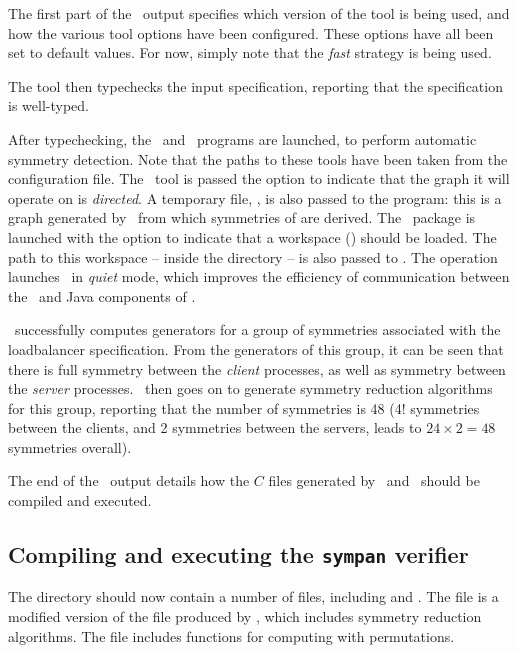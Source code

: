 The first part of the \topspin\ output specifies which version of
the tool is being used, and how the various tool options have been
configured. These options have all been set to default values.  For
now, simply note that the \emph{fast} strategy is being used.

The tool then typechecks the input specification, reporting that the
specification is well-typed.

After typechecking, the \saucy\ and \gap\ programs are launched, to
perform automatic symmetry detection.  Note that the paths to these
tools have been taken from the configuration file.  The \saucy\ tool
is passed the  option to indicate that the graph it will
operate on is \emph{directed}.  A temporary file,
, is also passed to the program: this is a graph
generated by \topspin\ from which symmetries of
 are derived.  The \gap\ package is launched
with the  option to indicate that a workspace
() should be loaded.  The
path to this workspace --  inside the
 directory -- is also passed to \gap.  The
 operation launches \gap\ in \emph{quiet} mode, which
improves the efficiency of communication between the \gap\ and Java
components of \topspin.

\topspin\ successfully computes generators for a group of symmetries
associated with the loadbalancer specification.  From the generators
of this group, it can be seen that there is full symmetry between
the \emph{client} processes, as well as symmetry between the
\emph{server} processes.  \topspin\ then goes on to generate
symmetry reduction algorithms for this group, reporting that the
number of symmetries is 48 (4! symmetries between the clients, and 2
symmetries between the servers, leads to $24\times 2=48$ symmetries
overall).

The end of the \topspin\ output details how the $C$ files generated
by \spin\ and \topspin\ should be compiled and executed.

\subsection{Compiling and executing the {\bf \texttt{sympan}} verifier}

The  directory should now contain a number of
files, including  and .  The
 file is a modified version of the 
file produced by \spin, which includes symmetry reduction
algorithms.  The  file includes functions for
computing with permutations.

